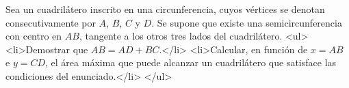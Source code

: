 Sea un cuadrilátero inscrito en una circunferencia, cuyos vértices se denotan consecutivamente por $A$, $B$, $C$ y $D$. Se supone que existe una semicircunferencia con centro en $AB$, tangente a los otros tres lados del cuadrilátero.
<ul>
<li>Demostrar que $AB=AD+BC$.</li>
<li>Calcular, en función de $x=AB$ e $y=CD$, el área máxima que puede alcanzar un cuadrilátero que satisface las condiciones del enunciado.</li>
</ul>
